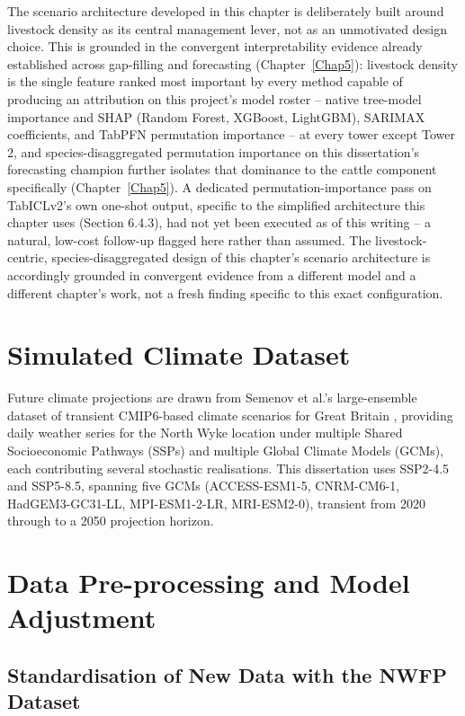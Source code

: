 The scenario architecture developed in this chapter is deliberately built around livestock density
as its central management lever, not as an unmotivated design choice. This is grounded in the
convergent interpretability evidence already established across gap-filling and forecasting
(Chapter~\ref{Chap5}): livestock density is the single feature ranked most important by every
method capable of producing an attribution on this project's model roster -- native tree-model
importance and SHAP (Random Forest, XGBoost, LightGBM), SARIMAX coefficients, and TabPFN permutation
importance -- at every tower except Tower 2, and species-disaggregated permutation importance on
this dissertation's forecasting champion further isolates that dominance to the cattle component
specifically (Chapter~\ref{Chap5}). A dedicated permutation-importance pass on TabICLv2's own
one-shot output, specific to the simplified architecture this chapter uses (Section 6.4.3), had not
yet been executed as of this writing -- a natural, low-cost follow-up flagged here rather than
assumed. The livestock-centric, species-disaggregated design of this chapter's scenario architecture
is accordingly grounded in convergent evidence from a different model and a different chapter's
work, not a fresh finding specific to this exact configuration.

\section{Simulated Climate Dataset}

Future climate projections are drawn from Semenov et al.'s large-ensemble dataset of transient
CMIP6-based climate scenarios for Great Britain \cite{semenov2025transient}, providing daily
weather series for the North Wyke location under multiple Shared Socioeconomic Pathways (SSPs) and
multiple Global Climate Models (GCMs), each contributing several stochastic realisations. This
dissertation uses SSP2-4.5 and SSP5-8.5, spanning five GCMs (ACCESS-ESM1-5, CNRM-CM6-1,
HadGEM3-GC31-LL, MPI-ESM1-2-LR, MRI-ESM2-0), transient from 2020 through to a 2050 projection
horizon.

\section{Data Pre-processing and Model Adjustment}

\subsection{Standardisation of New Data with the NWFP Dataset}

